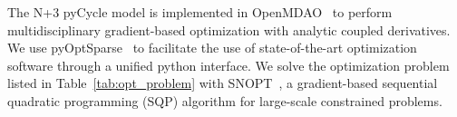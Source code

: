 \documentclass[conf]{new-aiaa}
\begin{document}


The N+3 pyCycle model is implemented in OpenMDAO~\cite{Gray2019a} to perform multidisciplinary gradient-based optimization with analytic coupled derivatives.
We use pyOptSparse~\cite{Wu2020a} to facilitate the use of state-of-the-art optimization software through a unified python interface.
We solve the optimization problem listed in Table~\ref{tab:opt_problem} with SNOPT~\cite{Gill2005a}, a gradient-based sequential quadratic programming (SQP) algorithm for large-scale constrained problems.
\end{document}
